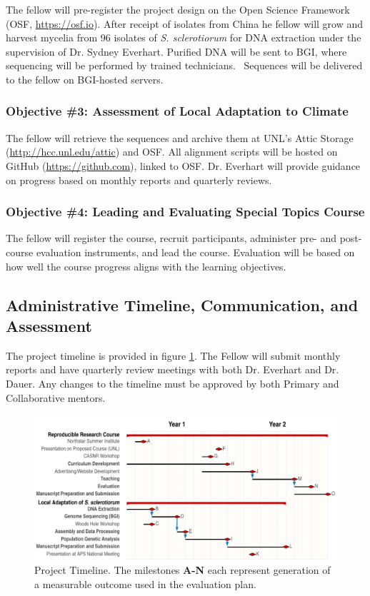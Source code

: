 \documentclass[12pt,letterpaper]{article}
\begin{document}
The fellow will pre-register the project design on the Open Science Framework (OSF, \url{https://osf.io}).
After receipt of isolates from China he fellow will grow and harvest mycelia from 96 isolates of \textit{S. sclerotiorum} for DNA extraction under the supervision of Dr. Sydney Everhart. 
Purified DNA will be sent to BGI, where sequencing will be performed by trained technicians. \
Sequences will be delivered to the fellow on BGI-hosted servers.

\subsubsection{Objective \#3: Assessment of Local Adaptation to Climate}

The fellow will retrieve the sequences and archive them at UNL's Attic Storage (\url{http://hcc.unl.edu/attic}) and OSF. 
All alignment scripts will be hosted on GitHub (\url{https://github.com}), linked to OSF. Dr. 
Everhart will provide guidance on progress based on monthly reports and quarterly reviews.

\subsubsection{Objective \#4: Leading and Evaluating Special Topics Course}

The fellow will register the course, recruit participants, administer pre- and post- course evaluation instruments, and lead the course. 
Evaluation will be based on how well the course progress aligns with the learning objectives. 

\subsection{Administrative Timeline, Communication, and Assessment}

The project timeline is provided in figure \ref{fig:timeline}. 
The Fellow will submit monthly reports and have quarterly review meetings with both Dr. Everhart and Dr. Dauer. 
Any changes to the timeline must be approved by both Primary and Collaborative mentors. 

\begin{figure}[!htbp]
  \centering
  \includegraphics[width=\textwidth]{packet/timeline.pdf}
  \caption{Project Timeline. The milestones \textbf{A-N} each represent generation of a measurable outcome used in the evaluation plan.}
  \label{fig:timeline}
\end{figure}
\end{document}
